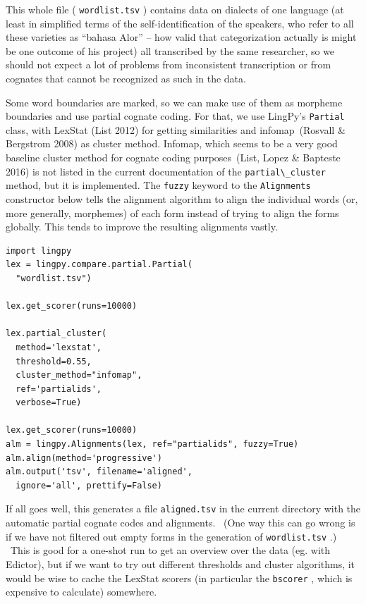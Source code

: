 \documentclass[
  english,
  a4paper,
  oneside,tablecaptionabove
]{scrbook}
\newcommand{\passthrough}[1]{#1}
\begin{document}
This whole file ( \passthrough{\lstinline!wordlist.tsv!} ) contains data
on dialects of one language (at least in simplified terms of the
self-identification of the speakers, who refer to all these varieties as
\enquote{bahasa Alor} -- how valid that categorization actually is might
be one outcome of his project) all transcribed by the same researcher,
so we should not expect a lot of problems from inconsistent
transcription or from cognates that cannot be recognized as such in the
data.

Some word boundaries are marked, so we can make use of them as morpheme
boundaries and use partial cognate coding. For that, we use LingPy's
\passthrough{\lstinline!Partial!} class, with LexStat (List 2012) for
getting similarities and infomap~(Rosvall \& Bergstrom 2008) as cluster
method. Infomap, which seems to be a very good baseline cluster method
for cognate coding purposes~(List, Lopez \& Bapteste 2016) is not listed
in the current documentation of the
\passthrough{\lstinline!partial\_cluster!} method, but it is
implemented. The \passthrough{\lstinline!fuzzy!} keyword to the
\passthrough{\lstinline!Alignments!} constructor below tells the
alignment algorithm to align the individual words (or, more generally,
morphemes) of each form instead of trying to align the forms globally.
This tends to improve the resulting alignments vastly.

\begin{lstlisting}
import lingpy
lex = lingpy.compare.partial.Partial(
  "wordlist.tsv")

lex.get_scorer(runs=10000)

lex.partial_cluster(
  method='lexstat',
  threshold=0.55,
  cluster_method="infomap",
  ref='partialids',
  verbose=True)

lex.get_scorer(runs=10000)
alm = lingpy.Alignments(lex, ref="partialids", fuzzy=True)
alm.align(method='progressive')
alm.output('tsv', filename='aligned',
  ignore='all', prettify=False)
\end{lstlisting}

If all goes well, this generates a file
\passthrough{\lstinline!aligned.tsv!} in the current directory with the
automatic partial cognate codes and alignments.~ (One way this can go
wrong is if we have not filtered out empty forms in the generation of
\passthrough{\lstinline!wordlist.tsv!} .) ~This is good for a one-shot
run to get an overview over the data (eg. with Edictor), but if we want
to try out different thresholds and cluster algorithms, it would be wise
to cache the LexStat scorers (in particular the
\passthrough{\lstinline!bscorer!} , which is expensive to calculate)
somewhere.
\end{document}
